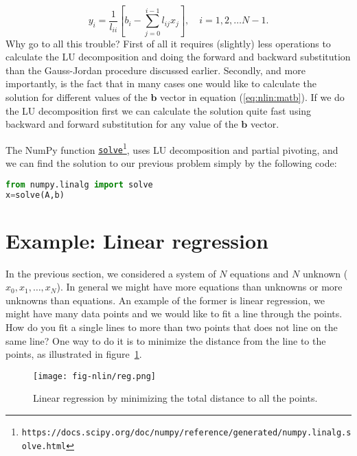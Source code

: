 \documentclass[graybox,sectrefs,envcountresetchap,open=right,final]{svmonodo}
\begin{document}
\begin{equation}
y_i=\frac{1}{l_{ii}}\left[b_i-\sum_{j=0}^{i-1}l_{ij}x_j\right],\quad i=1,2,\ldots N-1.
\label{eq:nlin:back3}
\end{equation}
Why go to all this trouble? First of all it requires (slightly) less operations to calculate the LU decomposition and doing the forward and backward substitution than the Gauss-Jordan procedure discussed earlier. Secondly, and more importantly, is the fact that in many cases one would like to calculate the solution for different values of the $\mathbf{b}$ vector in equation (\ref{eq:nlin:matb}). If we do the LU decomposition first we can calculate the solution quite fast using backward and forward substitution for any value of the $\mathbf{b}$ vector.

The NumPy function \href{{https://docs.scipy.org/doc/numpy/reference/generated/numpy.linalg.solve.html}}{\nolinkurl{solve}\footnote{\texttt{https://docs.scipy.org/doc/numpy/reference/generated/numpy.linalg.solve.html}}}, uses LU decomposition and partial pivoting, and we can find the solution to our previous problem simply by the following code:
\begin{lstlisting}[language=Python,style=blue1]
from numpy.linalg import solve
x=solve(A,b)
\end{lstlisting}

\section{Example: Linear regression}
In the previous section, we considered a system of $N$ equations and $N$ unknown ($x_0, x_1,\ldots, x_N$). In general we might have more equations than unknowns or more unknowns than equations. An example of the former is linear regression, we might have many data points and we would like to fit a line through the points. How do you fit a single lines to more than two points that does not line on the same line? One way to do it is to minimize the distance from the line to the points, as illustrated in figure~\ref{fig:nlin:reg}.

\begin{figure}[!ht]  %
  \centerline{\texttt{[image: fig-nlin/reg.png]}}
  \caption{
  Linear regression by minimizing the total distance to all the points. \label{fig:nlin:reg}
  }
\end{figure}
\end{document}
